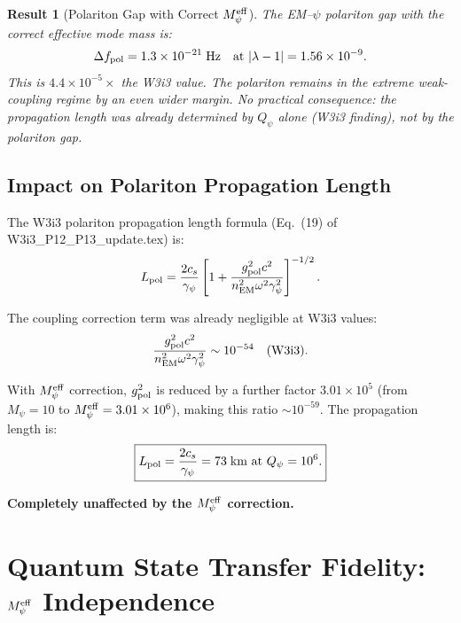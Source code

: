 \documentclass[aps,prd,twocolumn,superscriptaddress,nofootinbib]{revtex4-2}
\newcommand{\Qpsi}{Q_\psi}
\newcommand{\Meff}{M_\psi^{\rm eff}}
\newcommand{\ee}[1]{\times 10^{#1}}
\newtheorem{result}{Result}
\begin{document}
\begin{result}[Polariton Gap with Correct $\Meff$]
\label{res:gap}
The EM--$\psi$ polariton gap with the correct effective mode mass is:
\begin{equation}
\Delta f_{\rm pol} = 1.3\ee{-21}\;\text{Hz}
\quad\text{at }|\lambda-1| = 1.56\ee{-9}.
\end{equation}
This is $4.4\ee{-5}\times$ the W3i3 value. The polariton remains in
the extreme weak-coupling regime by an even wider margin. No practical
consequence: the propagation length was already determined by $\Qpsi$
alone (W3i3 finding), not by the polariton gap.
\end{result}

\subsection{Impact on Polariton Propagation Length}

The W3i3 polariton propagation length formula (Eq.~(19) of
W3i3\_P12\_P13\_update.tex) is:
\begin{equation}
L_{\rm pol} = \frac{2c_s}{\gamma_\psi}
\left[1 + \frac{g_{\rm pol}^2 c^2}{n_{\rm EM}^2\omega^2\gamma_\psi^2}
\right]^{-1/2}.
\end{equation}

The coupling correction term was already negligible at W3i3 values:
\begin{equation}
\frac{g_{\rm pol}^2 c^2}{n_{\rm EM}^2\omega^2\gamma_\psi^2}
\sim 10^{-54}\quad\text{(W3i3)}.
\end{equation}

With $\Meff$ correction, $g_{\rm pol}^2$ is reduced by a further factor
$3.01\ee{5}$ (from $M_\psi = 10$ to $\Meff = 3.01\ee{6}$), making
this ratio $\sim 10^{-59}$. The propagation length is:
\begin{equation}
\boxed{L_{\rm pol} = \frac{2c_s}{\gamma_\psi}
= 73\;\text{km at }\Qpsi = 10^6.}
\end{equation}

\textbf{Completely unaffected by the $\Meff$ correction.}

\section{Quantum State Transfer Fidelity: $\Meff$ Independence}
\label{sec:fidelity}
\end{document}

